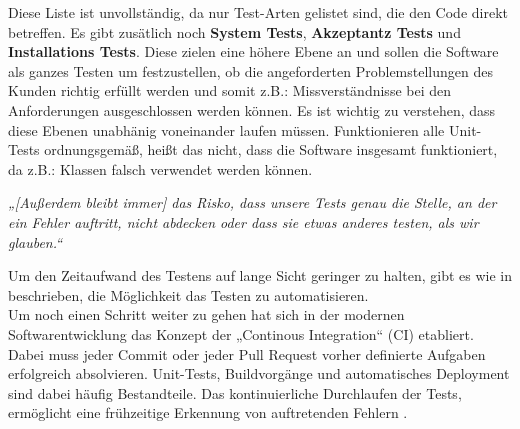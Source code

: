 Diese Liste ist unvollständig, da nur Test-Arten gelistet sind, die den Code direkt betreffen. Es gibt zusätlich noch \textbf{System Tests}, \textbf{Akzeptantz Tests} und \textbf{Installations Tests}. Diese zielen eine höhere Ebene an und sollen die Software als ganzes Testen um festzustellen, ob die angeforderten Problemstellungen des Kunden richtig erfüllt werden und somit z.B.: Missverständnisse bei den Anforderungen ausgeschlossen werden können.
Es ist wichtig zu verstehen, dass diese Ebenen unabhänig voneinander laufen müssen. Funktionieren alle Unit-Tests ordnungsgemäß, heißt das nicht, dass die Software insgesamt funktioniert, da z.B.: Klassen falsch verwendet werden können.\\
\begin{singlespace}
\textit{„[Außerdem bleibt immer] das Risko, dass unsere Tests genau die Stelle, an der ein Fehler auftritt, nicht abdecken oder dass sie etwas anderes testen, als wir glauben.“} \citep[S. 323]{fiveLines.2023}\\
\end{singlespace}
\par
Um den Zeitaufwand des Testens auf lange Sicht geringer zu halten, gibt es wie in \citep[S. 323]{fiveLines.2023} beschrieben, die Möglichkeit das Testen zu automatisieren.\\
Um noch einen Schritt weiter zu gehen hat sich in der modernen Softwarentwicklung das Konzept der „Continous Integration“ (CI) etabliert. Dabei muss jeder Commit oder jeder Pull Request vorher definierte Aufgaben erfolgreich absolvieren. Unit-Tests, Buildvorgänge und automatisches Deployment sind dabei häufig Bestandteile.
Das kontinuierliche Durchlaufen der Tests, ermöglicht eine frühzeitige Erkennung von auftretenden Fehlern \cite{CIMeyer.2014}.
